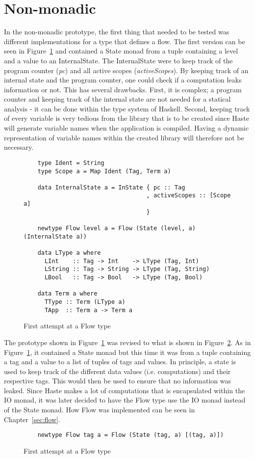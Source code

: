 \section{Non-monadic}
In the non-monadic prototype, the first thing that needed to be tested was different implementations for a type that defines a flow. The first version can be seen in Figure~\ref{fig:first_flow} and contained a State monad from a tuple containing a level and a value to an InternalState. The InternalState were to keep track of the program counter (\emph{pc}) and all active scopes (\emph{activeScopes}). By keeping track of an internal state and the program counter, one could check if a computation leaks information or not. This has several drawbacks. First, it is complex; a program counter and keeping track of the internal state are not needed for a statical analysis - it can be done within the type system of Haskell. Second, keeping track of every variable is very tedious from the library that is to be created since Haste will generate variable names when the application is compiled. Having a dynamic representation of variable names within the created library will therefore not be necessary.
\begin{figure}[h]
  \begin{verbatim}
    type Ident = String
    type Scope a = Map Ident (Tag, Term a)
    
    data InternalState a = InState { pc :: Tag
                                   , activeScopes :: [Scope a]
                                   }

    newtype Flow level a = Flow (State (level, a) (InternalState a))

    data LType a where
      LInt    :: Tag -> Int    -> LType (Tag, Int)
      LString :: Tag -> String -> LType (Tag, String)
      LBool   :: Tag -> Bool   -> LType (Tag, Bool)

    data Term a where
      TType :: Term (LType a)
      TApp  :: Term a -> Term a

  \end{verbatim}
  \caption{First attempt at a Flow type}
  \label{fig:first_flow}
\end{figure}

The prototype shown in Figure~\ref{fig:first_flow} was revised to what is shown in Figure~\ref{fig:second_flow}. As in Figure~\ref{fig:first_flow}, it contained a State monad but this time it was from a tuple containing a tag and a value to a list of tuples of tags and values. In principle, a state is used to keep track of the different data values (i.e. computations) and their respective tags. This would then be used to ensure that no information was leaked. Since Haste makes a lot of computations that is encapsulated within the IO monad, it was later decided to have the Flow type use the IO monad instead of the State monad. How Flow was implemented can be seen in Chapter~\ref{sec:flow}.
\begin{figure}[h]
  \begin{verbatim}
    newtype Flow tag a = Flow (State (tag, a) [(tag, a)])
  \end{verbatim}
  \caption{First attempt at a Flow type}
  \label{fig:second_flow}
\end{figure}

